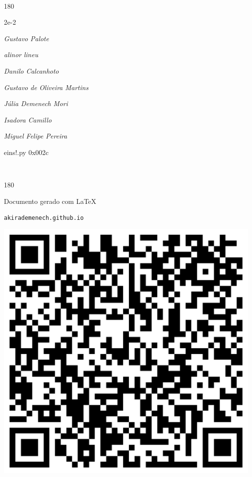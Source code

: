 \documentclass[12pt]{article}
\begin{document}
\pagebreak			

	\ 
	\vfill
	\begin{turn}{180}	
		\begin{minipage}{\textwidth}
		  	\ttfamily %
			\centering
			{\Huge 2e-2}
		  
			\hfill
		  
			

\textit{\small Gustavo Palote}

\textit{\small alinor lineu}

\textit{\small Danilo Calcanhoto}

\textit{\small Gustavo de Oliveira Martins}

\textit{\small Júlia Demenech Mori}

\textit{\small Isadora Camillo}

\textit{\small Miguel Felipe Pereira}

\bigskip

eins!.py
0x002c


		\end{minipage}	
	\end{turn}
	\vfill
	\

\pagebreak

	\begin{turn}{180}	
		\begin{minipage}{\textwidth}		  
		  Documento gerado com \LaTeX			
		  
		  \texttt{akirademenech.github.io}

		  \includegraphics[height=0.3\textheight]{2e-2.pdf}

		\end{minipage}	
	\end{turn}  
		  
\end{document}
